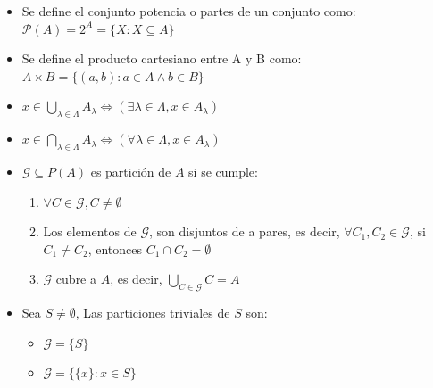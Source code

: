 \documentclass[letterpaper,11pt]{article}
\newcommand{\ssi}{\Longleftrightarrow} %
\theoremstyle{plain}
\begin{document}
\begin{framed}
		\begin{multicols}{2}
		    \begin{itemize}  
		        \item  Se define el conjunto potencia o partes de un conjunto como:
                $\mathcal{P}(A)=2^{A}=\{X:X\subseteq A\}$
                \item Se define el producto cartesiano entre A y B como:
                $A \times B=\{(a,b): a\in A \land b \in B \}$
                \item $\displaystyle x \in \bigcup_{\lambda \in \Lambda} A_{\lambda} \ssi (\exists \lambda \in \Lambda, x \in A_{\lambda})$ 
    
                \item $\displaystyle x \in \bigcap_{\lambda \in \Lambda} A_{\lambda} \ssi (\forall \lambda \in \Lambda, x \in A_{\lambda})$ 
                \vspace{10mm}
                \item $\mathcal{G} \subseteq P(A)$ es partición de $A$ si se cumple:
                    \begin{enumerate}
                        \item $\forall C \in \mathcal{G}, C \neq \emptyset$
                        \item Los elementos de $\mathcal{G}$, son disjuntos de a pares, es decir, $\forall C_{1},C_{2} \in \mathcal{G}$, si $C_{1} \neq C_{2}$, entonces $C_{1}\cap C_{2}= \emptyset$ 
                        \item $\mathcal{G}$ cubre a $A$, es decir, $\bigcup_{C \in \mathcal{G}} C=A$
                        
                    \end{enumerate}
                \item Sea $S\neq \emptyset$, Las particiones triviales de $S$ son:
                    \begin{itemize}
                        \item $\mathcal{G}=\{ S\}$
                        \item $\mathcal{G}=\{ \{x\} : x \in S\}$
                    \end{itemize}
                
                
            \end{itemize}
        \end{multicols}
\end{framed}
\end{document}
